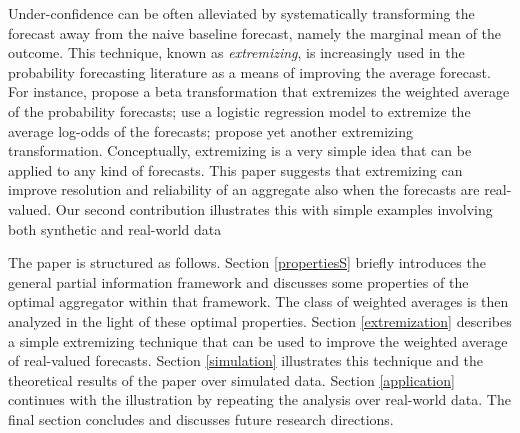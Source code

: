 \documentclass[11pt]{article}
\theoremstyle{definition}
\theoremstyle{definition}
\begin{document}
Under-confidence can be often alleviated by systematically transforming the forecast away from the naive baseline forecast, namely the marginal mean of the outcome. 
This technique, known as \textit{extremizing}, is increasingly used in the probability forecasting literature as a means of
improving the average forecast. For instance, \cite{Ranjan08} propose a beta transformation that extremizes the weighted average of
  the probability forecasts; \cite{satopaa} use a logistic regression model to extremize the average log-odds of the
  forecasts; \cite{baron2014two} propose yet another extremizing  transformation.
Conceptually, extremizing is a very simple idea that can be applied to any kind of forecasts.
 This paper suggests that extremizing can improve resolution and reliability of an aggregate also when the forecasts are real-valued. 
Our second contribution illustrates this with simple examples involving both synthetic and real-world data


The paper is structured as follows. Section \ref{propertiesS} briefly
introduces the general partial information framework and discusses some properties of
the optimal aggregator within that framework. The class of weighted
averages is then analyzed in the light of these optimal
properties. Section \ref{extremization} describes a simple extremizing
technique that can be used to improve the weighted average of
real-valued forecasts. Section \ref{simulation} illustrates this
technique and the theoretical results of the paper over simulated
data. Section \ref{application} continues with the illustration by
repeating the analysis over real-world data. The final section
concludes and discusses future research directions.
\end{document}
